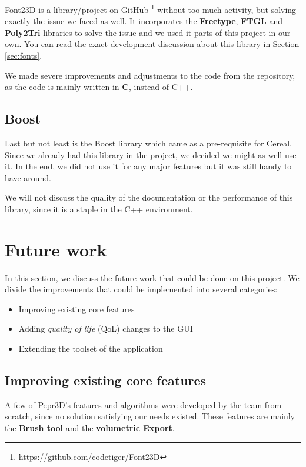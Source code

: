 Font23D is a library/project on GitHub \footnote{https://github.com/codetiger/Font23D} without too much activity, but solving exactly the issue we faced as well. It incorporates the \textbf{Freetype}, \textbf{FTGL} and \textbf{Poly2Tri} libraries to solve the issue and we used it parts of this project in our own. You can read the exact development discussion about this library in Section \ref{sec:fonts}.

We made severe improvements and adjustments to the code from the repository, as the code is mainly written in \textbf{C}, instead of C++.

\subsection{Boost}

Last but not least is the Boost library which came as a pre-requisite for Cereal. Since we already had this library in the project, we decided we might as well use it. In the end, we did not use it for any major features but it was still handy to have around.

We will not discuss the quality of the documentation or the performance of this library, since it is a staple in the C++ environment.

\section{Future work}

In this section, we discuss the future work that could be done on this project. We divide the improvements that could be implemented into several categories:

\begin{itemize}
\item Improving existing core features
\item Adding \textit{quality of life} (QoL) changes to the GUI
\item Extending the toolset of the application
\end{itemize}

\subsection{Improving existing core features}

A few of Pepr3D's features and algorithms were developed by the team from scratch, since no solution satisfying our needs existed. These features are mainly the \textbf{Brush tool} and the \textbf{volumetric Export}. 

